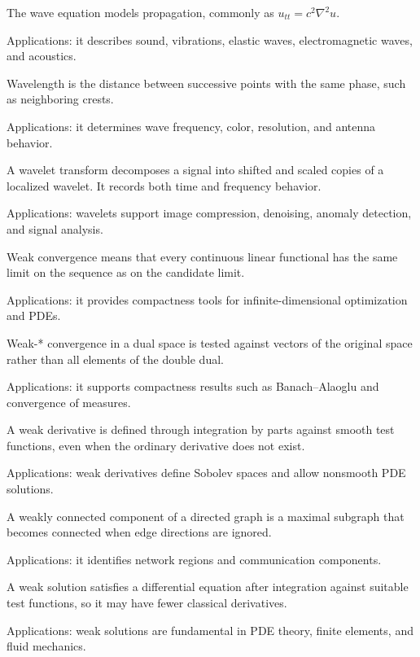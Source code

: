 The wave equation models propagation, commonly as $u_{tt}=c^2\nabla^2u$. \par\noindent Applications: it describes sound, vibrations, elastic waves, electromagnetic waves, and acoustics.

Wavelength is the distance between successive points with the same phase, such as neighboring crests. \par\noindent Applications: it determines wave frequency, color, resolution, and antenna behavior.

A wavelet transform decomposes a signal into shifted and scaled copies of a localized wavelet. It records both time and frequency behavior. \par\noindent Applications: wavelets support image compression, denoising, anomaly detection, and signal analysis.

Weak convergence means that every continuous linear functional has the same limit on the sequence as on the candidate limit. \par\noindent Applications: it provides compactness tools for infinite-dimensional optimization and PDEs.

Weak-* convergence in a dual space is tested against vectors of the original space rather than all elements of the double dual. \par\noindent Applications: it supports compactness results such as Banach--Alaoglu and convergence of measures.

A weak derivative is defined through integration by parts against smooth test functions, even when the ordinary derivative does not exist. \par\noindent Applications: weak derivatives define Sobolev spaces and allow nonsmooth PDE solutions.

A weakly connected component of a directed graph is a maximal subgraph that becomes connected when edge directions are ignored. \par\noindent Applications: it identifies network regions and communication components.

A weak solution satisfies a differential equation after integration against suitable test functions, so it may have fewer classical derivatives. \par\noindent Applications: weak solutions are fundamental in PDE theory, finite elements, and fluid mechanics.

